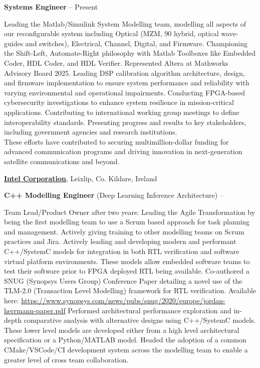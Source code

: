 \documentclass[letterpaper,MMMyyyy,nonstopmode]{simpleresumecv}
\begin{document}
\begin{Body}
\Gap
\BulletItem
\textbf{Systems Engineer}\hfill
{} --
Present
\begin{Detail}
\Gap
\SubBulletItem
Leading the Matlab/Simulink System Modelling team, modelling all aspects of our reconfigurable system including Optical (MZM, 90 hybrid, optical wave-guides and switches), Electrical, Channel, Digital, and Firmware.
\SubBulletItem
Championing the Shift-Left, Automate-Right philosophy with Matlab Toolboxes like Embedded Coder, HDL Coder, and HDL Verifier. Represented Altera at Mathworks Advisory Board 2025.
\SubBulletItem
Leading DSP calibration algorithm architecture, design, and firmware implementation to ensure system performance and reliability with varying environmental and operational impairments.
\SubBulletItem
Conducting FPGA-based cybersecurity investigations to enhance system resilience in mission-critical applications.
\SubBulletItem
Contributing to international working group meetings to define interoperability standards.
\SubBulletItem
Presenting progress and results to key stakeholders, including government agencies and research institutions.\smallskip \\
These efforts have contributed to securing multimillion-dollar funding for advanced communication programs and driving innovation in next-generation satellite communications and beyond.
\end{Detail}

\Entry
\href{http://www.intel.com}
{\textbf{Intel Corporation}},
Leixlip, Co. Kildare, Ireland

\Gap
\BulletItem
\textbf{C++ Modelling Engineer} (Deep Learning Inference Architecture)
\hfill
{} --
\begin{Detail}
\Gap
\SubBulletItem
Team Lead/Product Owner after two years: Leading the Agile Transformation by being the first modelling team to use a Scrum based approach for task planning and management. Actively giving training to other modelling teams on Scrum practices and Jira.
\SubBulletItem
Actively leading and developing modern and performant C++/SystemC models for integration in both RTL verification and software virtual platform environments. These models allow embedded software teams to test their software prior to FPGA deployed RTL being available.
\SubBulletItem
Co-authored a SNUG (Synopsys Users Group) Conference Paper detailing a novel use of the TLM-2.0 (Transaction Level Modelling) framework for RTL verification. Available here: \href{https://www.synopsys.com/news/pubs/snug/2020/europe/jordan-herrmann-paper.pdf}{https://www.synopsys.com/news/pubs/snug/2020/europe/jordan-herrmann-paper.pdf}
\SubBulletItem
Performed architectural performance exploration and in-depth comparative analysis with alternative designs using C++/SystemC models. These lower level models are developed either from a high level architectural specification or a Python/MATLAB model.
\SubBulletItem
Headed the adoption of a common CMake/VSCode/CI development system across the modelling team to enable a greater level of cross team collaboration.
\end{Detail}


\end{Body}
\end{document}
